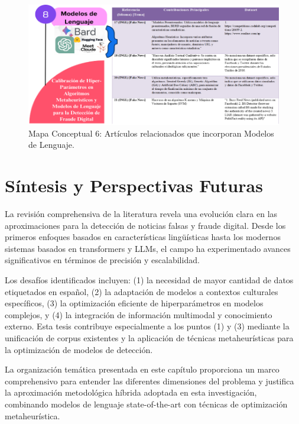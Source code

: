 \begin{figure}[h!]
    \centering
    \includegraphics[width=\textwidth]{Imagenes/mapaConceptual6.png}
    \caption{Mapa Conceptual 6: Artículos relacionados que incorporan Modelos de Lenguaje.}
    \label{fig:mapa_conceptual_6}
\end{figure}

\section{Síntesis y Perspectivas Futuras}
\label{sec:sintesis_perspectivas}

La revisión comprehensiva de la literatura revela una evolución clara en las aproximaciones para la detección de noticias falsas y fraude digital. Desde los primeros enfoques basados en características lingüísticas hasta los modernos sistemas basados en transformers y LLMs, el campo ha experimentado avances significativos en términos de precisión y escalabilidad.

Los desafíos identificados incluyen: (1) la necesidad de mayor cantidad de datos etiquetados en español, (2) la adaptación de modelos a contextos culturales específicos, (3) la optimización eficiente de hiperparámetros en modelos complejos, y (4) la integración de información multimodal y conocimiento externo. Esta tesis contribuye especialmente a los puntos (1) y (3) mediante la unificación de corpus existentes y la aplicación de técnicas metaheurísticas para la optimización de modelos de detección.

La organización temática presentada en este capítulo proporciona un marco comprehensivo para entender las diferentes dimensiones del problema y justifica la aproximación metodológica híbrida adoptada en esta investigación, combinando modelos de lenguaje state-of-the-art con técnicas de optimización metaheurística.